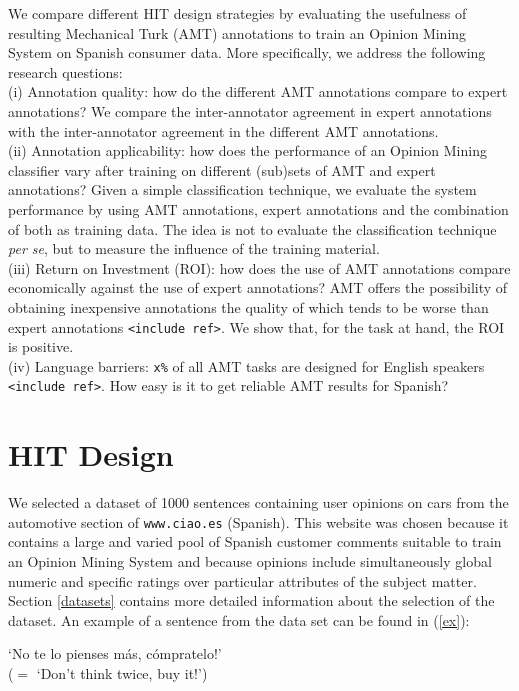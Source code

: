 \documentclass[11pt,letterpaper]{article}
\begin{document}
We compare different HIT design strategies by evaluating the usefulness of resulting Mechanical Turk (AMT) annotations to train an Opinion Mining System on Spanish consumer data. More specifically, we address the following research questions:\\
 \indent (i) Annotation quality: how do the different AMT annotations compare to expert annotations? We compare the inter-annotator agreement in expert annotations with the inter-annotator agreement in the different AMT annotations.\\
 \indent (ii) Annotation applicability: how does the performance of an Opinion Mining classifier vary after training on different (sub)sets of AMT and expert annotations? Given a simple classification technique, we evaluate the system performance by using AMT annotations, expert annotations and the combination of both as training data. The idea is not to evaluate the classification technique \textit{per se}, but to measure the influence of the training material.\\
 \indent (iii) Return on Investment (ROI): how does the use of AMT annotations compare economically against the use of expert annotations? AMT offers the possibility of obtaining inexpensive annotations the quality of which tends to be worse than expert annotations \texttt{<include ref>}. We show that, for the task at hand, the ROI is positive.\\
 \indent (iv) Language barriers: \texttt{x\%} of all AMT tasks are designed for English speakers \texttt{<include ref>}. How easy is it to get reliable AMT results for Spanish? 

\section{HIT Design}
\label{sect:design}

We selected a dataset of 1000 sentences containing user opinions on cars from the automotive section of \texttt{www.ciao.es} (Spanish). This website was chosen because it contains a large and varied pool of Spanish customer comments suitable to train an Opinion Mining System and because opinions include simultaneously global numeric and specific ratings over particular attributes of the subject matter. Section \ref{datasets} contains more detailed information about the selection of the dataset. An example of a sentence from the data set can be found in (\ref{ex}):

\begin{li}
  \label{ex}
  `No te lo pienses m\'{a}s, c\'{o}mpratelo!'\\
  ($=$ `Don't think twice, buy it!')
\end{li}
\end{document}
